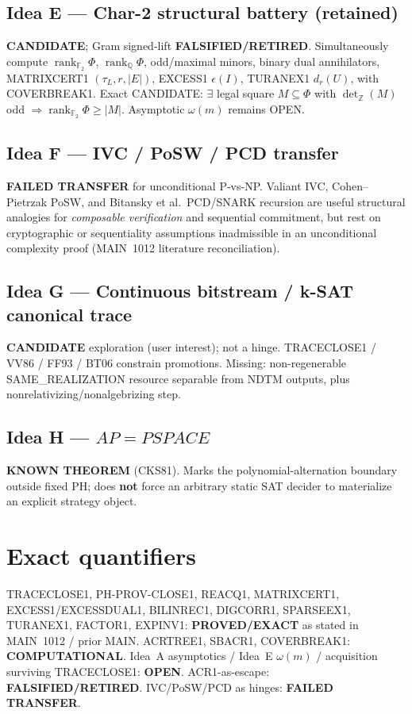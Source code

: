 \documentclass[11pt]{article}
\begin{document}
\subsection*{Idea E --- Char-2 structural battery (retained)}
\textbf{CANDIDATE}; Gram signed-lift \textbf{FALSIFIED/RETIRED}.
Simultaneously compute $\operatorname{rank}_{\mathbb F_2}\Phi$, $\operatorname{rank}_{\mathbb Q}\Phi$,
odd/maximal minors, binary dual annihilators, MATRIXCERT1 $(\tau_L,r,|E|)$, EXCESS1 $\epsilon(I)$,
TURANEX1 $d_r(U)$, with COVERBREAK1. Exact CANDIDATE:
$\exists$ legal square $M\subseteq\Phi$ with $\det_{\mathbb Z}(M)$ odd
$\Rightarrow\operatorname{rank}_{\mathbb F_2}\Phi\ge|M|$. Asymptotic $\omega(m)$ remains OPEN.

\subsection*{Idea F --- IVC / PoSW / PCD transfer}
\textbf{FAILED TRANSFER} for unconditional P-vs-NP. Valiant IVC, Cohen--Pietrzak PoSW, and
Bitansky et al.\ PCD/SNARK recursion are useful structural analogies for \emph{composable
verification} and sequential commitment, but rest on cryptographic or sequentiality assumptions
inadmissible in an unconditional complexity proof (MAIN~1012 literature reconciliation).

\subsection*{Idea G --- Continuous bitstream / k-SAT canonical trace}
\textbf{CANDIDATE} exploration (user interest); not a hinge. TRACECLOSE1 / VV86 / FF93 / BT06
constrain promotions. Missing: non-regenerable SAME\_REALIZATION resource separable from NDTM
outputs, plus nonrelativizing/nonalgebrizing step.

\subsection*{Idea H --- $AP=PSPACE$}
\textbf{KNOWN THEOREM} (CKS81). Marks the polynomial-alternation boundary outside fixed PH;
does \textbf{not} force an arbitrary static SAT decider to materialize an explicit strategy object.

\section*{Exact quantifiers}
TRACECLOSE1, PH-PROV-CLOSE1, REACQ1, MATRIXCERT1, EXCESS1/EXCESSDUAL1, BILINREC1, DIGCORR1,
SPARSEEX1, TURANEX1, FACTOR1, EXPINV1: \textbf{PROVED/EXACT} as stated in MAIN~1012 / prior MAIN.
ACRTREE1, SBACR1, COVERBREAK1: \textbf{COMPUTATIONAL}.
Idea~A asymptotics / Idea~E $\omega(m)$ / acquisition surviving TRACECLOSE1: \textbf{OPEN}.
ACR1-as-escape: \textbf{FALSIFIED/RETIRED}.
IVC/PoSW/PCD as hinges: \textbf{FAILED TRANSFER}.
\end{document}
